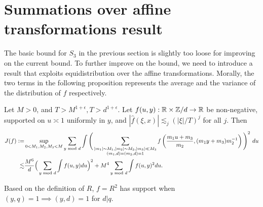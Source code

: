 \section{Summations over affine transformations result}
The basic bound for $S_3$ in the previous section is slightly too loose for improving on the current bound. To further improve on the bound, we need to introduce a result that exploits equidistribution over the affine transformations. Morally, the two terms in the following proposition represents the average and the variance of the distribution of $f$ respectively.

\iffalse
\begin{proposition}[Refinement of $S_3$]
    \label{refinements_3}
    We have \[
    S_3\lesssim \phi(q)^{7/2}T^2|\mathcal{S}|^{3/2}+\phi(q)^{3}\frac{NT}{q}|\mathcal{S}|^{1/2}E(\mathcal{S})^{1/2}.
     \]
\end{proposition}
The refinement of the previous bound relies on the result for summation over affine transformation by Guth and Maynard.
\begin{lemma} \label{affineGM}
    Let $M>0$. Let $f(u)\geq 0$, supported on $u\asymp 1$, and $|\hat{f}(\xi)|\lesssim_j ((1+|\xi|)/T)^{-j}$ for all $j\in \mathbb{N}$. Then \[
        \sup_{0<M_1,M_2,M_3<M} \int\Bigg( \sum_{\substack{|m_1|\sim M_1\\|m_2|\sim M_2 \\ |m_3|\ll M_3}} f\left(\frac{m_1 u+m_3}{m_2}\right)\Bigg)^2 \ du \lesssim M^6 \|f\|_{L_1}^2+M^4\|f\|_{L_2}^2.
    \] 
\end{lemma}
This is Proposition 9.1 from [GM]. The reduction in \[
\sum_{\substack{y_1,y_2 \in\mathbb{Z}/q\mathbb{Z} }}\int_{v_1\asymp 1}\Big[\sum_{\substack{|m_1|\sim M_1,|m_2|,|m_3|\sim M\\ y_1m_1+y_2m_2+m_3\equiv 0 \mod q_0}}\Big|\tilde{R}_M\left(\frac{m_1v_1+m_3}{-m_2v_1},y_2,y_1\right)\Big|^2\Big]^2dv_1\]
is somewhat lossy, so we aim to refine this bound in this section.
In principle, the condition $y_1m_1+y_2m_2+m_3\equiv 0$ fixes the residue class of $m_3$ based on $m_1$ and $m_2$. Therefore, we would expect a factor of $1/q^2$ if we add this summation condition to Proposition \ref{affineGM}. 
\fi
\begin{proposition}\label{affinetrans}
    Let $M>0$, and $T>M^{1+\epsilon}, T>d^{1+\epsilon}$. Let $f(u,y):\mathbb{R}\times \mathbb{Z}/d \to \mathbb{R}$ be non-negative, supported on $u\asymp 1$ uniformly in $y$, and $|\hat{f}(\xi,x)|\lesssim_j (|\xi|/T)^j$ for all $j$. Then \begin{align*}
        J(f)\mathrel{\mathop:}= &\sup_{0<M_1,M_2,M_3<M}\sum_{y \textrm{ mod } d} \int\Bigg( \sum_{\substack{|m_1|\sim M_1,|m_2|\sim M_2 , |m_3|\ll M_3\\ (m_1,d)=(m_2,d)=1}} f\left(\frac{m_1 u+m_3}{m_2},(m_1 y+m_3)m_2^{-1}\right)\Bigg)^2 \ du\\
        \lesssim&\frac{M^6}{d}\Big(\sum_{y \textrm{ mod } d } \int f(u,y) du\Big)^2+{M^4}\sum_{y\textrm{ mod } d} \int f(u,y)^2 du.
    \end{align*}
\end{proposition}
\begin{remark}
    Based on the definition of $R$, $f=R^2$ has support when $(y,q)=1 \implies (y,d)=1$ for $d|q$. 
\end{remark}

